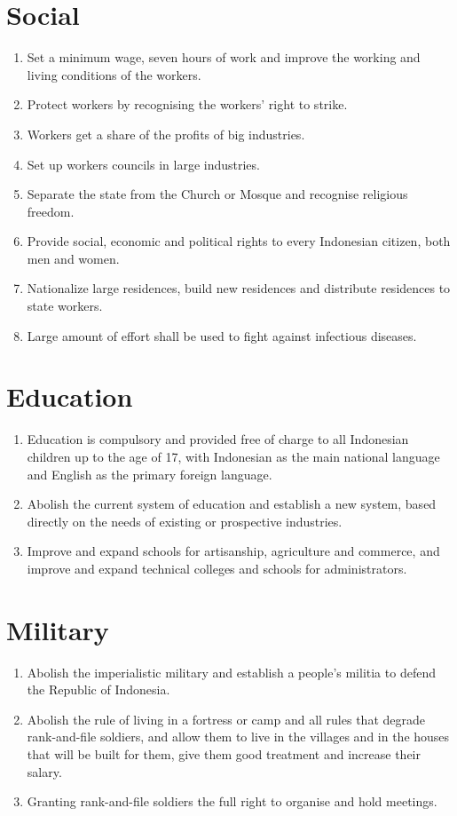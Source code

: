 \section{Social}

\begin{enumerate}
    \item Set a minimum wage, seven hours of work and improve the working and living conditions of the workers.
    \item Protect workers by recognising the workers' right to strike.
    \item Workers get a share of the profits of big industries.
    \item Set up workers councils in large industries.
    \item Separate the state from the Church or Mosque and recognise religious freedom.
    \item Provide social, economic and political rights to every Indonesian citizen, both men and women.
    \item Nationalize large residences, build new residences and distribute residences to state workers.
    \item Large amount of effort shall be used to fight against infectious diseases.
\end{enumerate}

\section{Education}

\begin{enumerate}
    \item Education is compulsory and provided free of charge to all Indonesian children up to the age of 17, with Indonesian as the main   national language and English as the primary foreign language.
    \item Abolish the current system of education and establish a new system, based directly on the needs of existing or prospective industries.
    \item Improve and expand schools for artisanship, agriculture and commerce, and improve and expand technical colleges and schools for administrators.
\end{enumerate}

\section{Military}

\begin{enumerate}
    \item Abolish the imperialistic military and establish a people's militia to defend the Republic of Indonesia.
    \item Abolish the rule of living in a fortress or camp and all rules that degrade rank-and-file soldiers, and allow them to live in the villages and in the houses that will be built for them, give them good treatment and increase their salary.
    \item Granting rank-and-file soldiers the full right to organise and hold meetings.
\end{enumerate}

